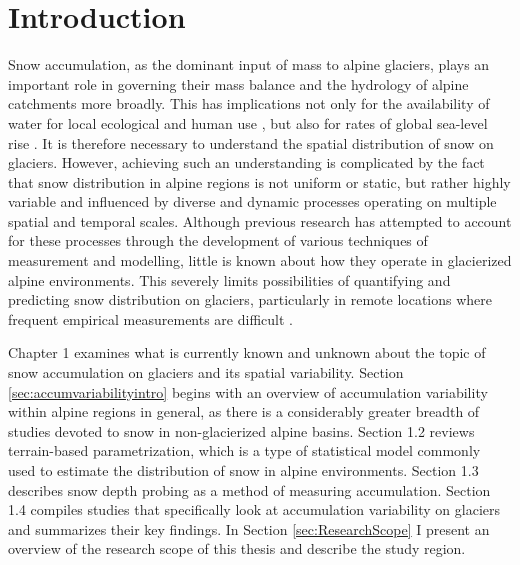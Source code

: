 \documentclass{sfuthesis}
\begin{document}
\tableofcontents\clearpage
{}\listoftables\clearpage
{}\listoffigures






\mainmatter%

\chapter{Introduction}

Snow accumulation, as the dominant input of mass to alpine glaciers, plays an important role in governing their mass balance and the hydrology of alpine catchments more broadly. This has implications not only for the availability of water for local ecological and human use \citep{Barnett2005,ONeel2014}, but also for rates of global sea-level rise \citep{Gardner2013}. It is therefore necessary to understand the spatial distribution of snow on glaciers. However, achieving such an understanding is complicated by the fact that snow distribution in alpine regions is not uniform or static, but rather highly variable and influenced by diverse and dynamic processes operating on multiple spatial and temporal scales. Although previous research has attempted to account for these processes through the development of various techniques of measurement and modelling, little is known about how they operate in glacierized alpine environments. This severely limits possibilities of quantifying and predicting snow distribution on glaciers, particularly in remote locations where frequent empirical measurements are difficult \citep{Nolan2015}.

Chapter 1 examines what is currently known and unknown about the topic of snow accumulation on glaciers and its spatial variability. Section \ref{sec:accumvariabilityintro} begins with an overview of accumulation variability within alpine regions in general, as there is a considerably greater breadth of studies devoted to snow in non-glacierized alpine basins. Section 1.2 reviews terrain-based parametrization, which is a type of statistical model commonly used to estimate the distribution of snow in alpine environments. Section 1.3 describes snow depth probing as a method of measuring accumulation. Section 1.4 compiles studies that specifically look at accumulation variability on glaciers and summarizes their key findings. In Section \ref{sec:ResearchScope} I present an overview of the research scope of this thesis and describe the study region.
\end{document}
